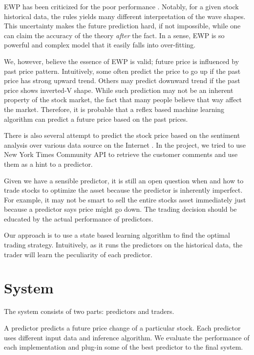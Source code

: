 \documentclass[twocolumn,10pt]{asme2ej}
\begin{document}
EWP has been criticized for the poor performance
\cite{aronson2007evidence-based}. Notably, for a given stock
historical data, the rules yields many different interpretation of the
wave shapes. This uncertainty makes the future prediction hard, if not
impossible, while one can claim the accuracy of the theory
\emph{after} the fact. In a sense, EWP is so powerful and complex
model that it easily falls into over-fitting.

We, however, believe the essence of EWP is valid; future price is influenced by
past price pattern. Intuitively, some often predict the price to go up if the
past price has strong upward trend. Others may predict downward trend if the
past price shows inverted-V shape. While such prediction may not be an inherent
property of the stock market, the fact that many people believe that way affect
the market. Therefore, it is probable that a reflex based machine learning
algorithm can predict a future price based on the past prices.

There is also several attempt to predict the stock price based on the sentiment
analysis over various data source on the Internet \cite{arXiv:1010.3003}. In the
project, we tried to use New York Times Community API
\cite{web:nytimes_community_api} to retrieve the customer comments and use them
as a hint to a predictor.

Given we have a sensible predictor, it is still an open question when and how to
trade stocks to optimize the asset because the predictor is inherently
imperfect. For example, it may not be smart to sell the entire stocks asset
immediately just because a predictor says price might go down. The trading
decision should be educated by the actual performance of predictors.

Our approach is to use a state based learning algorithm to find the
optimal trading strategy. Intuitively, as it runs the predictors on
the historical data, the trader will learn the peculiarity of each
predictor. 

\section{System}

The system consists of two parts: predictors and traders.

A predictor predicts a future price change of a particular
stock. Each predictor uses different input data and inference
algorithm. We evaluate the performance of each implementation and
plug-in some of the best predictor to the final system.
\end{document}
